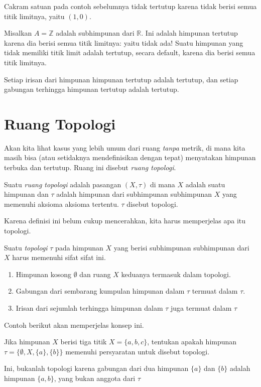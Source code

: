 \documentclass{book}
\begin{document}
\begin{contoh}
Cakram satuan pada contoh sebelumnya tidak tertutup karena tidak berisi semua titik limitnya, yaitu $(1,0)$.
\end{contoh}
\begin{contoh}
Misalkan $A=\mathbb Z$ adalah subhimpunan dari $\mathbb R$. Ini adalah himpunan tertutup karena dia berisi semua titik limitnya: yaitu tidak ada! Suatu himpunan yang tidak memiliki titik limit adalah tertutup, secara default, karena dia berisi semua titik limitnya.
\end{contoh}

Setiap irisan dari himpunan himpunan tertutup adalah tertutup, dan setiap gabungan terhingga himpunan tertutup adalah tertutup.

\section{Ruang Topologi}
Akan kita lihat kasus yang lebih umum dari ruang \emph{tanpa} metrik, di mana kita masih bisa (atau setidaknya mendefinisikan dengan tepat) menyatakan himpunan terbuka dan tertutup. Ruang ini disebut \emph{ruang topologi}.

\begin{definisi}
Suatu \emph{ruang topologi} adalah pasangan $(X, \tau)$ di mana $X$ adalah suatu himpunan dan $\tau$ adalah himpunan dari subhimpunan subhimpunan $X$ yang memenuhi aksioma aksioma tertentu. $\tau$ disebut topologi.
\end{definisi}
\noindent Karena definisi ini belum cukup mencerahkan, kita harus memperjelas apa itu topologi.

\begin{definisi}
Suatu \emph{topologi} $\tau$ pada himpunan $X$ yang berisi subhimpunan subhimpunan dari $X$ harus memenuhi sifat sifat ini.
\begin{enumerate}
\item Himpunan kosong $\emptyset$ dan ruang $X$ keduanya termasuk dalam topologi.
\item Gabungan dari sembarang kumpulan himpunan dalam $\tau$ termuat dalam $\tau$.
\item Irisan dari sejumlah terhingga himpunan dalam $\tau$ juga termuat dalam $\tau$
\end{enumerate}
\end{definisi}
\noindent Contoh berikut akan memperjelas konsep ini.

\begin{contoh}
Jika himpunan $X$ berisi tiga titik $X = \{ a,b,c \}$, tentukan apakah himpunan $\tau = \{ \emptyset, X, \{a\}, \{b\} \}$ memenuhi persyaratan untuk disebut topologi.
\end{contoh}
\noindent Ini, bukanlah topologi karena gabungan dari dua himpunan $\{a\}$ dan $\{b\}$ adalah himpunan $\{a,b\}$, yang bukan anggota dari $\tau$
\end{document}
